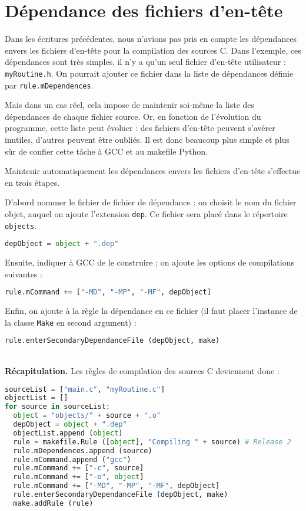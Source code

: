 \documentclass[a4paper,11pt]{extarticle}
\begin{document}
\section{Dépendance des fichiers d'en-tête}


Dans les écritures précédentes, nous n'avions pas pris en compte les dépendances envers les fichiers d'en-tête pour la compilation des sources C. Dans l'exemple, ces dépendances sont très simples, il n'y a qu'un seul fichier d'en-tête utilisateur : \texttt{myRoutine.h}. On pourrait ajouter ce fichier dans la liste de dépendances définie par \texttt{rule.mDependences}.

Mais dans un cas réel, cela impose de maintenir soi-même la liste des dépendances de chaque fichier source. Or, en fonction de l'évolution du programme, cette liste peut évoluer : des fichiers d'en-tête peuvent s'avérer inutiles, d'autres peuvent être oubliés. Il est donc beaucoup plus simple et plus sûr de confier cette tâche à GCC et au makefile Python.

Maintenir automatiquement les dépendances envers les fichiers d'en-tête s'effectue en trois étapes.

D'abord nommer le fichier de fichier de dépendance : on choisit le nom du fichier objet, auquel on ajoute l'extension \texttt{dep}. Ce fichier sera placé dans le répertoire \texttt{objects}.
\begin{lstlisting}[language=py]
  depObject = object + ".dep"
\end{lstlisting}

Ensuite, indiquer à GCC de le construire ; on ajoute les options de compilations suivantes :
\begin{lstlisting}[language=py]
  rule.mCommand += ["-MD", "-MP", "-MF", depObject]
\end{lstlisting}

Enfin, on ajoute à la règle la dépendance en ce fichier (il faut placer l'instance de la classe \texttt{Make} en second argument) :
\begin{lstlisting}[language=py]
  rule.enterSecondaryDependanceFile (depObject, make)
\end{lstlisting}


~\\{\bf Récapitulation.} Les règles de compilation des sources C deviennent donc :
\begin{lstlisting}[language=py]
sourceList = ["main.c", "myRoutine.c"]
objectList = []
for source in sourceList:
  object = "objects/" + source + ".o"
  depObject = object + ".dep"
  objectList.append (object)
  rule = makefile.Rule ([object], "Compiling " + source) # Release 2
  rule.mDependences.append (source)
  rule.mCommand.append ("gcc")
  rule.mCommand += ["-c", source]
  rule.mCommand += ["-o", object]
  rule.mCommand += ["-MD", "-MP", "-MF", depObject]
  rule.enterSecondaryDependanceFile (depObject, make)
  make.addRule (rule)
\end{lstlisting}
\end{document}
